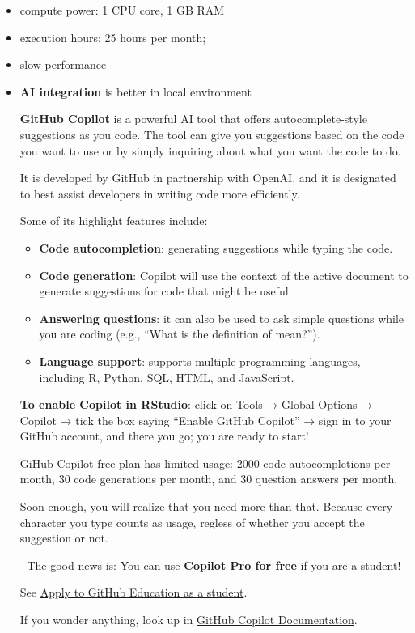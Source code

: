 \documentclass[
  12pt,
  letterpaper,
]{scrbook}
\providecommand{\tightlist}{%
  \setlength{\itemsep}{0pt}\setlength{\parskip}{0pt}}
\renewcommand{\tightlist}{\setlength{\itemsep}{0.5\baselineskip}\setlength{\parskip}{0.2\baselineskip}}
\theoremstyle{plain}
\theoremstyle{definition}
\theoremstyle{remark}
\begin{document}
\begin{itemize}
\item
  compute power: 1 CPU core, 1 GB RAM
\item
  execution hours: 25 hours per month;
\item
  slow performance
\item
  {\textbf{AI integration}} is better in local environment

  \textbf{GitHub Copilot} is a powerful AI tool that offers
  autocomplete-style suggestions as you code. The tool can give you
  suggestions based on the code you want to use or by simply inquiring
  about what you want the code to do.

  It is developed by GitHub in partnership with OpenAI, and it is
  designated to best assist developers in writing code more efficiently.

  Some of its highlight features include:

  \begin{itemize}
  \tightlist
  \item
    \textbf{Code autocompletion}: generating suggestions while typing
    the code.
  \item
    \textbf{Code generation}: Copilot will use the context of the active
    document to generate suggestions for code that might be useful.
  \item
    \textbf{Answering questions}: it can also be used to ask simple
    questions while you are coding (e.g., ``What is the definition of
    mean?'').
  \item
    \textbf{Language support}: supports multiple programming languages,
    including R, Python, SQL, HTML, and JavaScript.
  \end{itemize}

  \textbf{To enable Copilot in RStudio}: click on Tools → Global Options
  → Copilot → tick the box saying ``Enable GitHub Copilot'' → sign in to
  your GitHub account, and there you go; you are ready to start!

  GiHub Copilot free plan has limited usage: 2000 code autocompletions
  per month, 30 code generations per month, and 30 question answers per
  month.

  Soon enough, you will realize that you need more than that. Because
  every character you type counts as usage, regless of whether you
  accept the suggestion or not.

  🎈 The good news is: You can use \textbf{Copilot Pro for free} if you
  are a student!

  See
  \href{https://docs.github.com/en/education/explore-the-benefits-of-teaching-and-learning-with-github-education/github-education-for-students/apply-to-github-education-as-a-student}{Apply
  to GitHub Education as a student}.

  If you wonder anything, look up in
  \href{https://docs.github.com/en/copilot}{GitHub Copilot
  Documentation}.
\end{itemize}
\end{document}

